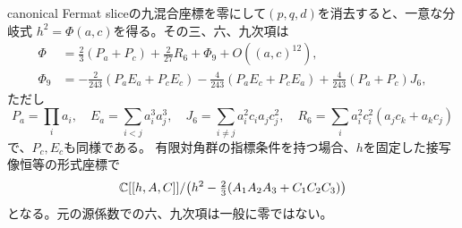 \begin{theorem}\label{mh:fibre}
canonical Fermat sliceの九混合座標を零にして$(p,q,d)$を消去すると、一意な分岐式
$h^2=\Phi(a,c)$を得る。その三、六、九次項は
\begin{align*}
 \Phi&=\frac23(P_a+P_c)+\frac2{27}R_6+\Phi_9+O((a,c)^{12}),\\
 \Phi_9&=-\frac2{243}(P_aE_a+P_cE_c)-\frac4{243}(P_aE_c+P_cE_a)
       +\frac4{243}(P_a+P_c)J_6,
\end{align*}
ただし
\[
 P_a=\prod_i a_i,\quad E_a=\sum_{i<j}a_i^3a_j^3,\quad
 J_6=\sum_{i\ne j}a_i^2c_i a_jc_j^2,\quad
 R_6=\sum_i a_i^2c_i^2(a_jc_k+a_kc_j)
\]
で、$P_c,E_c$も同様である。
有限対角群の指標条件を持つ場合、$h$を固定した接写像恒等の形式座標で
\[
 \mathbb C[[h,A,C]]/\bigl(h^2-\tfrac23(A_1A_2A_3+C_1C_2C_3)\bigr)
\]
となる。元の源係数での六、九次項は一般に零ではない。
\end{theorem}

